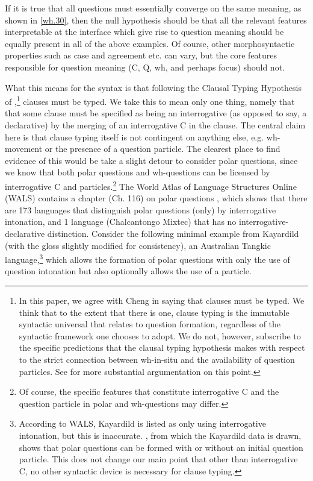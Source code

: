 \documentclass{glossa}
\begin{document}
If it is true that all questions must essentially converge on the same meaning, as shown in \ref{wh.30}, then the null hypothesis should be that all the relevant features interpretable at the interface which give rise to question meaning should be equally present in all of the above examples. Of course, other morphosyntactic properties such as case and agreement etc. can vary, but the core features responsible for question meaning (C, Q, wh, and perhaps focus) should not.

What this means for the syntax is that following the Clausal Typing Hypothesis of \cite{cheng:1997},\footnote{In this paper, we agree with Cheng in saying that clauses must be typed. We think that to the extent that there is one, clause typing is the immutable syntactic universal that relates to question formation, regardless of the syntactic framework one chooses to adopt. We do not, however, subscribe to the specific predictions that the clausal typing hypothesis makes with respect to the strict connection between wh-in-situ and the availability of question particles. See \cite{bruening:2007} for more substantial argumentation on this point.} clauses must be typed. We take this to mean only one thing, namely that that some clause must be specified as being an interrogative (as opposed to say, a declarative) by the merging of an interrogative C in the clause. The central claim here is that clause typing itself is not contingent on anything else, e.g. wh-movement or the presence of a question particle. The clearest place to find evidence of this would be take a slight detour to consider polar questions, since we know that both polar questions and wh-questions can be licensed by interrogative C and particles.\footnote{Of course, the specific features that constitute interrogative C and the question particle in polar and wh-questions may differ.} The World Atlas of Language Structures Online (WALS) contains a chapter (Ch. 116) on polar questions \citep{wals116:2013}, which shows that there are 173 languages that distinguish polar questions (only) by interrogative intonation, and 1 language (Chalcantongo Mixtec) that has no interrogative-declarative distinction. Consider the following minimal example from Kayardild (with the gloss slightly modified for consistency), an Australian Tangkic language,\footnote{According to WALS, Kayardild is listed as only using interrogative intonation, but this is inaccurate. \cite{evans:1995}, from which the Kayardild data is drawn, shows that polar questions can be formed with or without an initial question particle. This does not change our main point that other than interrogative C, no other syntactic device is necessary for clause typing.} which allows the formation of polar questions with only the use of question intonation but also optionally allows the use of a particle.
\end{document}

